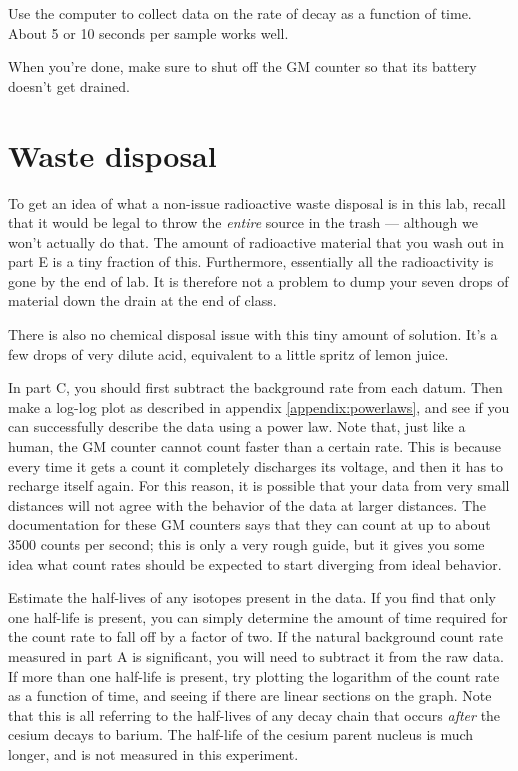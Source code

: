 Use the computer to collect data on the rate of decay as a function of time. About 5 or 10 seconds
per sample works well.

When you're done, make sure to shut off the GM counter so that its battery doesn't get drained.

\section*{Waste disposal}

To get an idea of what a non-issue  radioactive waste disposal is in this lab,
recall that it would be legal to throw the \emph{entire} source in the trash --- although we won't
actually do that.
The amount of radioactive material that you wash out in part E is a tiny fraction of this.
Furthermore, essentially all the radioactivity is
gone by the end of lab. It is therefore not a problem to dump your seven drops of material
down the drain at the end of class.

There is also no chemical disposal issue with this tiny amount of solution.
It's a few drops of very dilute acid, equivalent to a little spritz of lemon juice.

\analysis

In part C, you should first subtract the background
rate from each datum. Then make a log-log plot as described in appendix \ref{appendix:powerlaws},
and see if you can successfully describe the data using a power law.
Note that, just like a human, the GM counter cannot count faster than a certain rate.
This is because every time it gets a count it completely discharges its voltage, and
then it has to recharge itself again. For this reason, it is possible that your data
from very small distances will not agree with the behavior of the data at larger distances.
The documentation for these GM counters says that they can count at up to about
3500 counts per second; this is only a very rough guide, but it gives you some idea what
count rates should be expected to start diverging from ideal behavior.

Estimate the half-lives of any isotopes present in the data. If you find that only one
half-life is present, you can simply determine the 
amount of time required for the count rate to fall off by a factor of two.
If the natural background count rate measured in part A is significant, you will need to subtract it from the raw data.
If more than one half-life is present, try plotting the logarithm of the count rate
as a function of time, and seeing if there are linear sections on the graph.
Note that this is all referring to the half-lives of any decay chain that occurs
\emph{after} the cesium decays to barium. The half-life of the cesium parent
nucleus is much longer, and is not measured in this experiment.

